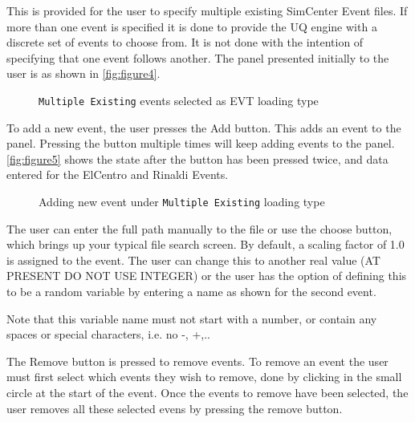 This is provided for the user to specify multiple existing SimCenter
Event files.  If more than one event is specified it is done to provide
the UQ engine with a discrete set of events to choose from.  It is not
done with the intention of specifying that one event follows another.
The panel presented initially to the user is as shown
in \autoref{fig:figure4}.

\begin{figure}[!htbp]
  \caption{\texttt{Multiple Existing} events selected as EVT loading type}
  \label{fig:figure4}
\end{figure}

To add a new event, the user presses the Add button.  This adds an event to the panel.  Pressing the button multiple times will keep adding events to the panel.  \autoref{fig:figure5} shows the state after the button has been pressed twice, and data entered for the ElCentro and Rinaldi Events.

\begin{figure}[!htbp]
  \caption{Adding new event under \texttt{Multiple Existing} loading type}
  \label{fig:figure5}
\end{figure}

The user can enter the full path manually to the file or use the
choose button, which brings up your typical file search screen.  By
default, a scaling factor of 1.0 is assigned to the event.  The user
can change this to another real value (AT PRESENT DO NOT USE INTEGER)
or the user has the option of defining this to be a random variable by
entering a name as shown for the second event.

Note that this variable name must not start with a number, or contain
any spaces or special characters, i.e. no -, +,..

The Remove button is pressed to remove events. To remove an event the
user must first select which events they wish to remove, done by
clicking in the small circle at the start of the event. Once the
events to remove have been selected, the user removes all these
selected evens by pressing the remove button.

